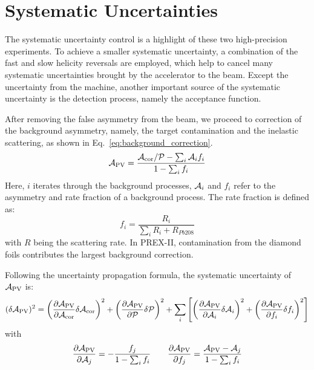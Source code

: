 \chapter{Systematic Uncertainties}

The systematic uncertainty control is a highlight of these two
high-precision experiments. To achieve a smaller systematic uncertainty, a
combination of the fast and slow helicity reversals are employed, which help
to cancel many systematic uncertainties brought by the accelerator to the
beam. Except the uncertainty from the machine, another important source
of the systematic uncertainty is the detection process, namely the 
acceptance function.

After removing the false asymmetry from the beam, we proceed to correction of the
background asymmetry, namely, the target contamination and the inelastic scattering,
as shown in Eq.~\ref{eq:background_correction}.
\begin{equation}
    \mathcal{A}_{\text{PV}} = \frac{\mathcal{A}_{\text{cor}}/\mathcal{P} - \sum_i \mathcal{A}_i f_i}{1 - \sum_i f_i}
    \label{eq:background_correction}
\end{equation}
Here, $i$ iterates through the background processes, $\mathcal{A}_i$ and $f_i$ refer to 
the asymmetry and rate fraction of a background process. The rate fraction is defined
as:
\begin{equation}
    f_i = \frac{R_i}{\sum_i R_i + R_{Pb208}}
\end{equation}
with $R$ being the scattering rate.
In PREX-II, contamination from the diamond foils contributes the largest 
background correction.

Following the uncertainty propagation formula, the systematic uncertainty of
$\mathcal{A}_{\text{PV}}$ is:
\begin{equation}
    (\delta \mathcal{A}_{\text{PV}})^2 = 
      \left( \frac{\partial \mathcal{A}_{\text{PV}}}{\partial \mathcal{A}_{\text{cor}}} \delta \mathcal{A}_{\text{cor}} \right)^2
      + \left( \frac{\partial \mathcal{A}_{\text{PV}}}{\partial \mathcal{P}} \delta \mathcal{P} \right)^2
      + \sum_i \left[ \left(\frac{\partial \mathcal{A}_{\text{PV}}}{\partial \mathcal{A}_i}\delta \mathcal{A}_i \right)^2 
	 + \left(\frac{\partial \mathcal{A}_{\text{PV}}}{\partial f_i}\delta f_i \right)^2 \right]
\end{equation}
with
\begin{equation}
    \frac{\partial \mathcal{A}_{\text{PV}}}{\partial \mathcal{A}_j} = -\frac{f_j}{1 - \sum_i f_i}  \qquad
    \frac{\partial \mathcal{A}_{\text{PV}}}{\partial f_j} = \frac{\mathcal{A}_{\text{PV}} - \mathcal{A}_j}{1 - \sum_i f_i}
    \label{eq:systematic_uncertainty}
\end{equation}

